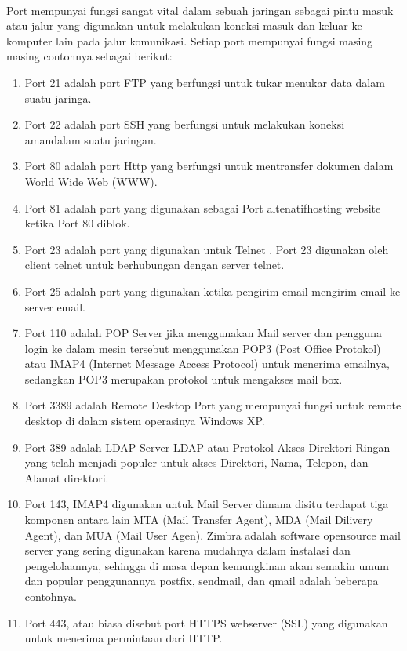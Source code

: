 \documentclass[12pt,a4paper]{article}
\begin{document}
\paragraph{}
\hspace{1cm}
Port mempunyai fungsi sangat vital dalam sebuah jaringan sebagai pintu masuk atau jalur yang digunakan untuk melakukan koneksi masuk dan keluar ke komputer lain pada jalur komunikasi. Setiap port mempunyai fungsi masing masing contohnya sebagai berikut:
\begin{enumerate}
\item Port 21 adalah port FTP yang berfungsi untuk tukar menukar data dalam suatu jaringa.
\item Port 22 adalah port SSH yang berfungsi untuk  melakukan koneksi amandalam suatu jaringan.
\item Port 80 adalah port Http yang berfungsi untuk mentransfer dokumen dalam World Wide Web (WWW).
\item Port 81 adalah port yang digunakan sebagai Port altenatifhosting website ketika Port 80 diblok.
\item Port 23 adalah port yang digunakan untuk Telnet . Port 23 digunakan oleh client telnet untuk berhubungan dengan server telnet.
\item Port 25 adalah port yang digunakan ketika pengirim email  mengirim email ke server email.
\item Port 110 adalah POP Server  jika menggunakan Mail server dan pengguna login ke dalam mesin tersebut menggunakan POP3 (Post Office Protokol) atau IMAP4 (Internet Message Access Protocol) untuk menerima emailnya, sedangkan POP3 merupakan protokol untuk mengakses mail box.
\item Port 3389 adalah Remote Desktop Port yang  mempunyai fungsi untuk remote desktop di dalam sistem operasinya Windows XP.
\item Port 389 adalah LDAP Server LDAP atau Protokol Akses Direktori Ringan yang telah
menjadi populer untuk akses Direktori, Nama, Telepon, dan Alamat direktori.
\item Port 143, IMAP4 digunakan untuk Mail Server dimana disitu terdapat tiga komponen antara lain MTA (Mail Transfer Agent), MDA (Mail Dilivery Agent), dan MUA (Mail User Agen). Zimbra adalah software opensource mail server yang sering digunakan karena mudahnya dalam instalasi dan pengelolaannya, sehingga di masa depan kemungkinan akan semakin umum dan popular penggunannya postfix, sendmail, dan qmail adalah beberapa contohnya.
\item Port 443, atau biasa disebut port HTTPS webserver (SSL) yang digunakan untuk menerima permintaan dari HTTP.

\end{enumerate}
\end{document}
